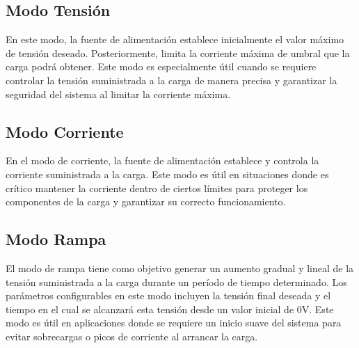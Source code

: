 \subsection{Modo Tensión}
En este modo, la fuente de alimentación establece inicialmente el valor máximo de tensión deseado. Posteriormente, limita la corriente máxima de umbral que la carga podrá obtener. Este modo es especialmente útil cuando se requiere controlar la tensión suministrada a la carga de manera precisa y garantizar la seguridad del sistema al limitar la corriente máxima.\par 
\subsection{Modo Corriente}
En el modo de corriente, la fuente de alimentación establece y controla la corriente suministrada a la carga. Este modo es útil en situaciones donde es crítico mantener la corriente dentro de ciertos límites para proteger los componentes de la carga y garantizar su correcto funcionamiento.\par 
\subsection{Modo Rampa}
El modo de rampa tiene como objetivo generar un aumento gradual y lineal de la tensión suministrada a la carga durante un período de tiempo determinado. Los parámetros configurables en este modo incluyen la tensión final deseada y el tiempo en el cual se alcanzará esta tensión desde un valor inicial de 0V. Este modo es útil en aplicaciones donde se requiere un inicio suave del sistema para evitar sobrecargas o picos de corriente al arrancar la carga.\par 
